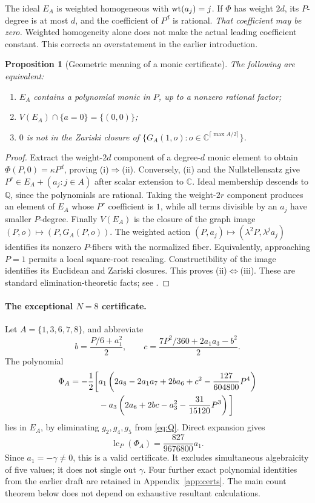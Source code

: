 \documentclass[11pt,a4paper]{article}
\newtheorem{proposition}[theorem]{Proposition}
\theoremstyle{definition}\newtheorem{definition}[theorem]{Definition}
\theoremstyle{remark}\newtheorem{remark}[theorem]{Remark}
\newcommand{\Q}{\mathbb Q}\newcommand{\Qb}{\overline{\mathbb Q}}
\newcommand{\C}{\mathbb C}\newcommand{\R}{\mathbb R}\newcommand{\Z}{\mathbb Z}
\newcommand{\lc}{\operatorname{lc}}\newcommand{\trdeg}{\operatorname{trdeg}}
\begin{document}
The ideal $E_A$ is weighted homogeneous with $\operatorname{wt}(a_j)=j$. If $\Phi$ has weight $2d$, its $P$-degree is at most $d$, and the coefficient of $P^d$ is rational. \emph{That coefficient may be zero.} Weighted homogeneity alone does not make the actual leading coefficient constant. This corrects an overstatement in the earlier introduction.

\begin{proposition}[Geometric meaning of a monic certificate]\label{prop:monic}
The following are equivalent:
\begin{enumerate}[label=(\roman*)]
\item $E_A$ contains a polynomial monic in $P$, up to a nonzero rational factor;
\item $V(E_A)\cap\{a=0\}=\{(0,0)\}$;
\item $0$ is not in the Zariski closure of $\{G_A(1,o):o\in\C^{\lceil\max A/2\rceil}\}$.
\end{enumerate}
\end{proposition}
\begin{proof}
Extract the weight-$2d$ component of a degree-$d$ monic element to obtain
$\Phi(P,0)=\kappa P^d$, proving (i)$\Rightarrow$(ii). Conversely, (ii) and the Nullstellensatz give
$P^r\in E_A+(a_j:j\in A)$ after scalar extension to $\C$. Ideal membership descends to $\Q$, since the polynomials are rational. Taking the weight-$2r$ component produces an element of $E_A$ whose $P^r$ coefficient is $1$, while all terms divisible by an $a_j$ have smaller $P$-degree. Finally $V(E_A)$ is the closure of the graph image $(P,o)\mapsto(P,G_A(P,o))$. The weighted action
$(P,a_j)\mapsto(\lambda^2P,\lambda^ja_j)$ identifies its nonzero $P$-fibers with the normalized fiber. Equivalently, approaching $P=1$ permits a local square-root rescaling. Constructibility of the image identifies its Euclidean and Zariski closures. This proves (ii)$\Leftrightarrow$(iii). These are standard elimination-theoretic facts; see \cite{CLO}.
\end{proof}

\paragraph{The exceptional $N=8$ certificate.}
Let $A=\{1,3,6,7,8\}$, and abbreviate
\[
b=\frac{P/6+a_1^2}{2},\qquad
c=\frac{7P^2/360+2a_1a_3-b^2}{2}.
\]
The polynomial
\begin{align}\label{eq:cert8}
\Phi_A=-\frac12\bigg[&a_1\left(2a_8-2a_1a_7+2ba_6+c^2-\frac{127}{604800}P^4\right)\notag\\
&-a_3\left(2a_6+2bc-a_3^2-\frac{31}{15120}P^3\right)\bigg]
\end{align}
lies in $E_A$, by eliminating $g_2,g_4,g_5$ from \eqref{eq:Q}. Direct expansion gives
\[
\lc_P(\Phi_A)=\frac{827}{9676800}a_1.
\]
Since $a_1=-\gamma\ne0$, this is a valid certificate. It excludes simultaneous algebraicity of five values; it does not single out $\gamma$. Four further exact polynomial identities from the earlier draft are retained in Appendix~\ref{app:certs}. The main count theorem below does not depend on exhaustive resultant calculations.
\end{document}
